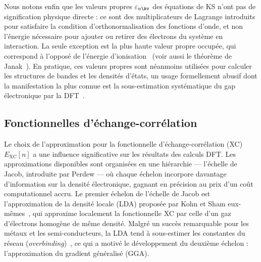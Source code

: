Nous notons enfin que les valeurs propres $\varepsilon_{n\kv}$ des équations de KS n'ont pas de signification physique directe : ce sont des multiplicateurs de Lagrange introduits pour satisfaire la condition d'orthonormalisation des fonctions d'onde, et non l'énergie nécessaire pour ajouter ou retirer des électrons du système en interaction. La seule exception est la plus haute valeur propre occupée, qui correspond à l'opposé de l'énergie d'ionisation~\cite{perdewDensityFunctionalTheoryFractional1982,almbladhExactResultsCharge1985} (voir aussi le théorème de Janak~\cite{janakProof1978}). En pratique, ces valeurs propres sont néanmoins utilisées pour calculer les structures de bandes et les densités d'états, un usage formellement abusif dont la manifestation la plus connue est la sous-estimation systématique du gap électronique par la DFT~\cite{perdewPhysicalContentExact1983,shamDensityFunctionalTheoryEnergy1983}.

\subsection{Fonctionnelles d'échange-corrélation}\label{sec:XC}

Le choix de l'approximation pour la fonctionnelle d'échange-corrélation (XC) $E_\text{XC}[n]$ a une influence significative sur les résultats des calculs DFT. Les approximations disponibles sont organisées en une hiérarchie --- l'échelle de Jacob, introduite par Perdew \cite{perdewJacobsLadderDensity2001} --- où chaque échelon incorpore davantage d'information sur la densité électronique, gagnant en précision au prix d'un coût computationnel accru. Le premier échelon de l'échelle de Jacob est l'approximation de la densité locale (LDA) proposée par Kohn et Sham eux-mêmes~\cite{kohnSelfConsistentEquationsIncluding1965}, qui approxime localement la fonctionnelle XC par celle d'un gaz d'électrons homogène de même densité. Malgré un succès remarquable pour les métaux et les semi-conducteurs, la LDA tend à sous-estimer les constantes du réseau (\textit{overbinding})~\cite{perdewAtomsMoleculesSolids1992}, ce qui a motivé le développement du deuxième échelon : l'approximation du gradient généralisé (GGA).

